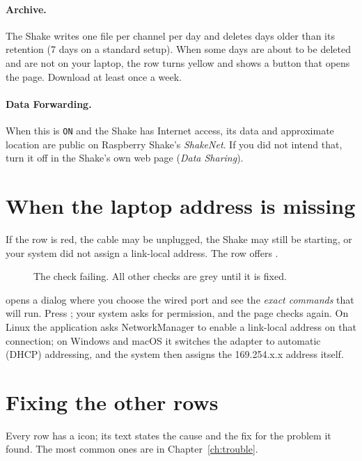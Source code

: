 \paragraph{Archive.} The Shake writes one file per channel per day and deletes days older than its retention (7 days on a standard
setup). When some days are about to be deleted and are not on your laptop, the row turns yellow and shows a
 button that opens the  page. Download at least once a week.

\paragraph{Data Forwarding.} When this is \texttt{ON} and the Shake has Internet access, its data and approximate location are
public on Raspberry Shake's \emph{ShakeNet}. If you did not intend that, turn it off in the Shake's own web page
(\emph{Data Sharing}).

\section{When the laptop address is missing}
If the  row is red, the cable may be unplugged, the Shake may still be starting, or your system did not assign
a link-local address. The row offers .

\begin{figure}[tbp]
\centering
{}
\caption{The  check failing. All other checks are grey until it is fixed.}
\end{figure}

 opens a dialog where you choose the wired port and see the \emph{exact commands} that will run. Press ; your
system asks for permission, and the page checks again. On Linux the application asks NetworkManager to enable a link-local
address on that connection; on Windows and macOS it switches the adapter to automatic (DHCP) addressing, and the system then
assigns the 169.254.x.x address itself.

\section{Fixing the other rows}
Every row has a  icon; its text states the cause and the fix for the problem it found. The most
common ones are in Chapter~\ref{ch:trouble}.
